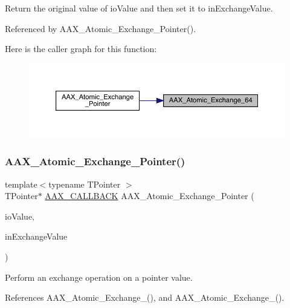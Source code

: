 Return the original value of io\+Value and then set it to in\+Exchange\+Value. 



Referenced by A\+A\+X\+\_\+\+Atomic\+\_\+\+Exchange\+\_\+\+Pointer().

Here is the caller graph for this function\+:
\nopagebreak
\begin{figure}[H]
\begin{center}
\leavevmode
\includegraphics[width=350pt]{a00398_a0a683337ef8627f1e2b01e69d5f11cb0_icgraph}
\end{center}
\end{figure}
\mbox{\label{a00398_a02803b3ea269d4ed4758a91eec9fa46c}} 
\subsubsection{\texorpdfstring{AAX\_Atomic\_Exchange\_Pointer()}{AAX\_Atomic\_Exchange\_Pointer()}}
{\footnotesize\ttfamily template$<$typename T\+Pointer $>$ \\
T\+Pointer$\ast$ \mbox{\hyperlink{a00392_aaa22112139aa627574b1ef562f579d43}{A\+A\+X\+\_\+\+C\+A\+L\+L\+B\+A\+CK}} A\+A\+X\+\_\+\+Atomic\+\_\+\+Exchange\+\_\+\+Pointer (\begin{DoxyParamCaption}\item[{T\+Pointer $\ast$\&}]{io\+Value,  }\item[{T\+Pointer $\ast$}]{in\+Exchange\+Value }\end{DoxyParamCaption})}



Perform an exchange operation on a pointer value. 



References A\+A\+X\+\_\+\+Atomic\+\_\+\+Exchange\+\_(), and A\+A\+X\+\_\+\+Atomic\+\_\+\+Exchange\+\_().

